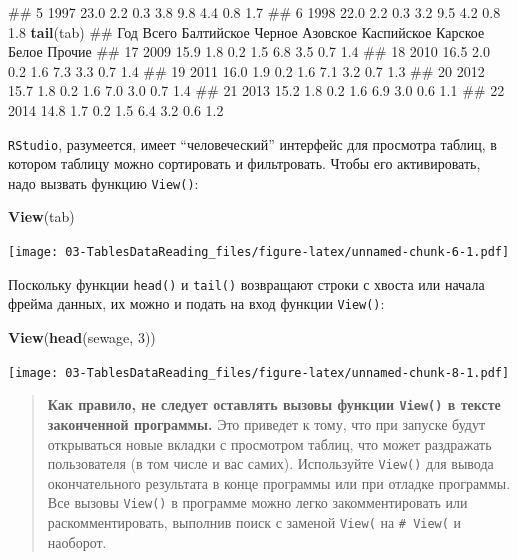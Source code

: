 \documentclass[]{book}
\newenvironment{Shaded}{\begin{snugshade}}{\end{snugshade}}
\newcommand{\KeywordTok}[1]{\textcolor[rgb]{0.13,0.29,0.53}{\textbf{#1}}}
\newcommand{\DecValTok}[1]{\textcolor[rgb]{0.00,0.00,0.81}{#1}}
\newcommand{\NormalTok}[1]{#1}
\begin{document}
\begin{Shaded}
\begin{Highlighting}[]
\NormalTok{## 5 1997  23.0        2.2    0.3      3.8        9.8     4.4   0.8    1.7}
\NormalTok{## 6 1998  22.0        2.2    0.3      3.2        9.5     4.2   0.8    1.8}
\KeywordTok{tail}\NormalTok{(tab)}
\NormalTok{##     Год Всего Балтийское Черное Азовское Каспийское Карское Белое Прочие}
\NormalTok{## 17 2009  15.9        1.8    0.2      1.5        6.8     3.5   0.7    1.4}
\NormalTok{## 18 2010  16.5        2.0    0.2      1.6        7.3     3.3   0.7    1.4}
\NormalTok{## 19 2011  16.0        1.9    0.2      1.6        7.1     3.2   0.7    1.3}
\NormalTok{## 20 2012  15.7        1.8    0.2      1.6        7.0     3.0   0.7    1.4}
\NormalTok{## 21 2013  15.2        1.8    0.2      1.6        6.9     3.0   0.6    1.1}
\NormalTok{## 22 2014  14.8        1.7    0.2      1.5        6.4     3.2   0.6    1.2}
\end{Highlighting}
\end{Shaded}

\texttt{RStudio}, разумеется, имеет ``человеческий'' интерфейс для
просмотра таблиц, в котором таблицу можно сортировать и фильтровать.
Чтобы его активировать, надо вызвать функцию \texttt{View()}:

\begin{Shaded}
\begin{Highlighting}[]
\KeywordTok{View}\NormalTok{(tab)}
\end{Highlighting}
\end{Shaded}

\texttt{[image: 03-TablesDataReading\_files/figure-latex/unnamed-chunk-6-1.pdf]}

Поскольку функции \texttt{head()} и \texttt{tail()} возвращают строки с
хвоста или начала фрейма данных, их можно и подать на вход функции
\texttt{View()}:

\begin{Shaded}
\begin{Highlighting}[]
\KeywordTok{View}\NormalTok{(}\KeywordTok{head}\NormalTok{(sewage, }\DecValTok{3}\NormalTok{))}
\end{Highlighting}
\end{Shaded}

\texttt{[image: 03-TablesDataReading\_files/figure-latex/unnamed-chunk-8-1.pdf]}

\begin{quote}
\textbf{Как правило, не следует оставлять вызовы функции \texttt{View()}
в тексте законченной программы.} Это приведет к тому, что при запуске
будут открываться новые вкладки с просмотром таблиц, что может
раздражать пользователя (в том числе и вас самих). Используйте
\texttt{View()} для вывода окончательного результата в конце программы
или при отладке программы. Все вызовы \texttt{View()} в программе можно
легко закомментировать или раскомментировать, выполнив поиск с заменой
\texttt{\textquotesingle{}View(\textquotesingle{}} на
\texttt{\textquotesingle{}\#\ View(\textquotesingle{}} и наоборот.
\end{quote}
\end{document}
